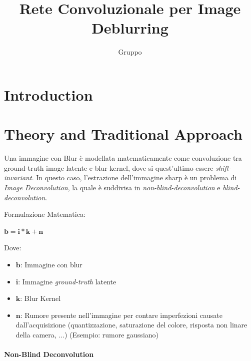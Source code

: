 \documentclass[a4paper,10pt,twocolumn]{article}
\title{\textbf{Rete Convoluzionale per Image Deblurring}}
\author{Gruppo}
\begin{document}

\section{Introduction}\cite{convir}

\section{Theory and Traditional Approach}

Una immagine con Blur \`e modellata matematicamente come convoluzione tra ground-truth image latente e blur kernel, dove si quest'ultimo essere \textit{\gls{shift-invariant}}. In questo caso,
l'estrazione dell'immagine sharp \`e un problema di \textit{Image Deconvolution}, la quale \`e suddivisa in \textit{\Gls{non-blind-deconvolution}} e \textit{\Gls{blind-deconvolution}}.\par
Formulazione Matematica:

\begin{math}
  \bm{b} = \bm{i} * \bm{k} + \bm{n}
\end{math}

Dove:

\begin{itemize}[topsep=0pt, noitemsep]
  \item[] $\bm{b}$: Immagine con blur
  \item[] $\bm{i}$: Immagine \textit{ground-truth} latente
  \item[] $\bm{k}$: Blur Kernel
  \item[] $\bm{n}$: Rumore presente nell'immagine per contare imperfezioni causate dall'acquisizione (quantizzazione, saturazione del colore, risposta non linare della camera, ...) (Esempio: rumore gaussiano)
\end{itemize}

\paragraph*{Non-Blind Deconvolution}
\end{document}
